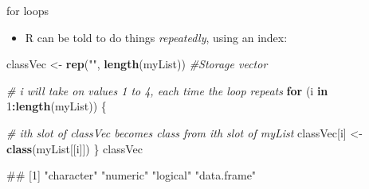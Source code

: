 \documentclass[
  ignorenonframetext,
  aspectratio=169]{beamer}
\newenvironment{Shaded}{\begin{snugshade}}{\end{snugshade}}
\newcommand{\CommentTok}[1]{\textcolor[rgb]{0.56,0.35,0.01}{\textit{#1}}}
\newcommand{\ControlFlowTok}[1]{\textcolor[rgb]{0.13,0.29,0.53}{\textbf{#1}}}
\newcommand{\DecValTok}[1]{\textcolor[rgb]{0.00,0.00,0.81}{#1}}
\newcommand{\FunctionTok}[1]{\textcolor[rgb]{0.13,0.29,0.53}{\textbf{#1}}}
\newcommand{\NormalTok}[1]{#1}
\newcommand{\OtherTok}[1]{\textcolor[rgb]{0.56,0.35,0.01}{#1}}
\newcommand{\SpecialCharTok}[1]{\textcolor[rgb]{0.81,0.36,0.00}{\textbf{#1}}}
\newcommand{\StringTok}[1]{\textcolor[rgb]{0.31,0.60,0.02}{#1}}
\providecommand{\tightlist}{%
  \setlength{\itemsep}{0pt}\setlength{\parskip}{0pt}}
\let\oldShaded\Shaded %
\let\endoldShaded\endShaded
\renewenvironment{Shaded}{\footnotesize\oldShaded}{\endoldShaded}
\let\oldverbatim\verbatim %Change fontsize of code chunk output
\let\endoldverbatim\endverbatim
\renewenvironment{verbatim}{\footnotesize\oldverbatim}{\endoldverbatim}
\begin{document}
\begin{frame}[fragile]{for loops}
\protect\hypertarget{for-loops}{}
\begin{itemize}[<+->]
\tightlist
\item
  R can be told to do things \emph{repeatedly}, using an index:
\end{itemize}

\begin{Shaded}
\begin{Highlighting}[]
\NormalTok{classVec }\OtherTok{\textless{}{-}} \FunctionTok{rep}\NormalTok{(}\StringTok{""}\NormalTok{, }\FunctionTok{length}\NormalTok{(myList))  }\CommentTok{\#Storage vector}

\CommentTok{\# i will take on values 1 to 4, each time the loop repeats}
\ControlFlowTok{for}\NormalTok{ (i }\ControlFlowTok{in} \DecValTok{1}\SpecialCharTok{:}\FunctionTok{length}\NormalTok{(myList)) \{}

    \CommentTok{\# ith slot of classVec becomes class from ith slot of myList}
\NormalTok{    classVec[i] }\OtherTok{\textless{}{-}} \FunctionTok{class}\NormalTok{(myList[[i]])}
\NormalTok{\}}
\NormalTok{classVec}
\end{Highlighting}
\end{Shaded}

\begin{verbatim}
## [1] "character"  "numeric"    "logical"    "data.frame"
\end{verbatim}
\end{frame}
\end{document}
